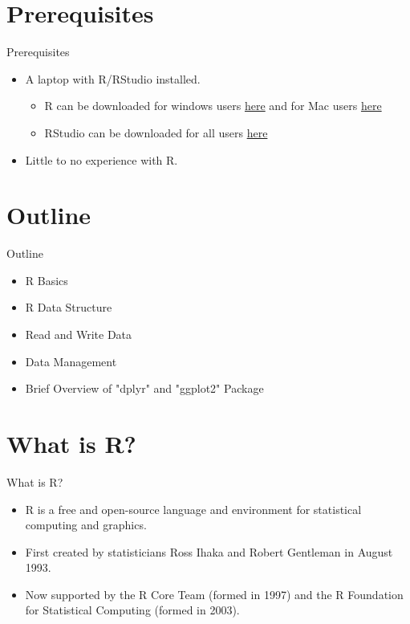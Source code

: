 \documentclass{beamer}
\begin{document}
\section{Prerequisites}

\begin{frame}{Prerequisites}

\begin{itemize}
    \item A laptop with R/RStudio installed.
    \begin{itemize}
        \item R can be downloaded for windows users \href{https://cran.r-project.org/bin/windows/base/}{here} and for Mac users \href{https://cran.r-project.org/bin/macosx/}{here}
        \item RStudio can be downloaded for all users \href{https://www.rstudio.com/products/rstudio/download/}{here}
    \end{itemize}
    \item Little to no experience with R.
\end{itemize}
    
\end{frame}

\section{Outline}

\begin{frame}{Outline}
    
\begin{itemize}
    \item R Basics
    \item R Data Structure
    \item Read and Write Data
    \item Data Management
    \item Brief Overview of "dplyr" and "ggplot2" Package
\end{itemize}
    
\end{frame}

\section{What is R?}

\begin{frame}{What is R?}
    \begin{itemize}
        \item R is a free and open-source language and environment for statistical computing and graphics.
        \item First created by statisticians Ross Ihaka and Robert Gentleman in August 1993.
        \item Now supported by the R Core Team (formed in 1997) and the R Foundation for Statistical Computing (formed in 2003).
    \end{itemize}
\end{frame}
\end{document}

